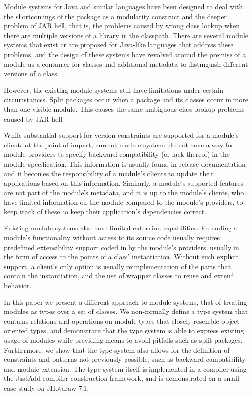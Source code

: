 Module systems for Java and similar languages have been designed 
to deal with the shortcomings of the package as a modularity construct
and the deeper problem of JAR hell, that is, the problems caused
by wrong class lookup when there are multiple versions of a library
in the classpath. There are several module systems that exist or are
proposed for Java-like languages \cite{OSGi4, netassemblies, JSR294, JSR277}
that address these problems, and the design of these systems have
revolved around the premise of a module as a container for classes
and additional metadata to distinguish different versions of a class.

However, the existing module systems still have limitations under 
certain circumstances. Split packages \cite{iJAMComments} occur when 
a package and its classes occur in more than one visible module. This
causes the same ambiguous class lookup problems caused by JAR hell.

While substantial support for version constraints are supported
for a module's clients at the point of import, current module 
systems do not have a way for module providers to specify backward 
compatibility (or lack thereof) in the module specification. 
This information is usually found in release documentation and 
it becomes the responsibility of a module's clients to update 
their applications based on this information. Similarly, a module's 
supported features are not part of the module's metadata, and it 
is up to the module's clients, who have limited 
information on the module compared to the module's providers, to 
keep track of these to keep their application's dependencies correct.

Existing module systems also have limited extension capabilities. Extending
a module's functionality without access to its source code usually 
requires predefined extensibility support coded in by the module's 
providers, usually in the form of access to the points of a class' 
instantiation. Without such explicit support, a client's only option
is usually reimplementation of the parts that contain the instantiation, 
and the use of wrapper classes to reuse and extend behavior.

In this paper we present a different approach to module systems, 
that of treating modules as types over a set of classes. We non-formally
define a type system that contains relations and operations on module types 
that closely resemble object-oriented types, and demonstrate that the type
system is able to express existing usage of modules while providing means 
to avoid pitfalls such as split packages. 
Furthermore, we show that the type system also allows for the
definition of constraints and patterns not previously possible, such
as backward compatibility and module extension. The type system
itself is implemented in a compiler using the JastAdd compiler construction
framework, and is demonstrated on a small case study on JHotdraw 7.1.
